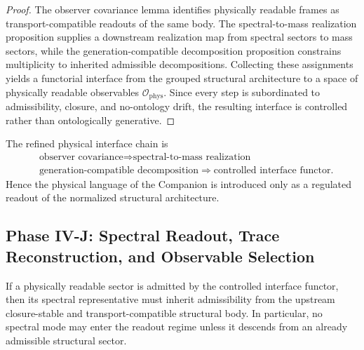 \begin{proof}
The observer covariance lemma identifies physically readable frames as transport-compatible readouts of the same body. The spectral-to-mass realization proposition supplies a downstream realization map from spectral sectors to mass sectors, while the generation-compatible decomposition proposition constrains multiplicity to inherited admissible decompositions. Collecting these assignments yields a functorial interface from the grouped structural architecture to a space of physically readable observables $\mathcal O_{\mathrm{phys}}$. Since every step is subordinated to admissibility, closure, and no-ontology drift, the resulting interface is controlled rather than ontologically generative.
\end{proof}

\begin{corollary}
\label{cor:refined-physical-interface-chain}
The refined physical interface chain is
\[
\begin{aligned}
&\text{observer covariance}
  \Longrightarrow \text{spectral-to-mass realization}\\
&\text{generation-compatible decomposition}
  \Longrightarrow \text{controlled interface functor}.
\end{aligned}
\]
Hence the physical language of the Companion is introduced only as a regulated readout of the normalized structural architecture.
\end{corollary}








\subsection*{Phase IV-J: Spectral Readout, Trace Reconstruction, and Observable Selection}

\begin{lemma}
\label{lem:spectral-admissibility-inheritance}
If a physically readable sector is admitted by the controlled interface functor, then its spectral representative must inherit admissibility from the upstream closure-stable and transport-compatible structural body. In particular, no spectral mode may enter the readout regime unless it descends from an already admissible structural sector.
\end{lemma}

